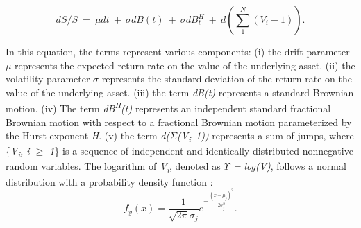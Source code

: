 \documentclass[12pt,a4paper]{report}
\numberwithin{equation}{section}
\begin{document}
\[dS/S\  = \ \mu dt\  + \ \sigma dB(t)\  + \ \sigma dB_{t}^{H}\  + \ d\left( \sum_{1}^{N}\left( V_{i} - 1 \right) \right).\]

In this equation, the terms represent various components: (i) the drift
parameter \emph{$\mu$} represents the expected return rate on the value of
the underlying asset. (ii) the volatility parameter \emph{$\sigma$} represents
the standard deviation of the return rate on the value of the underlying
asset. (iii) the term \emph{dB(t)} represents a standard Brownian
motion. (iv) The term \emph{dB\textsuperscript{H}(t)} represents an
independent standard fractional Brownian motion with respect to a
fractional Brownian motion parameterized by the Hurst exponent \emph{H}.
(v) the term \emph{d($\Sigma$(V\textsubscript{i}--1))} represents a sum of
jumps, where \{\emph{V\textsubscript{i}, i $\geq$ 1}\} is a sequence of
independent and identically distributed nonnegative random variables.
The logarithm of \emph{V\textsubscript{i}}, denoted as \emph{$\Upsilon$ =
log(V)}, follows a normal distribution with a probability density
function \cite{merton1976option_93}:
\[
f_{y}(x) = \frac{1}{\sqrt{2\pi}\sigma_{j}}e^{- \frac{{(x - \mu_{j})}^{2}}{2\sigma_{j}^{2}}}.
\]
\end{document}

